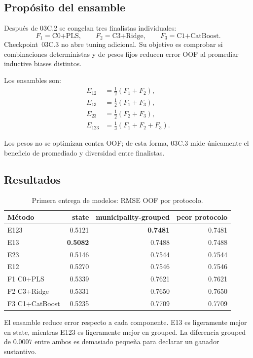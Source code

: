 \subsection{Propósito del ensamble}

Después de 03C.2 se congelan tres finalistas individuales:
\[
F_1=\text{C0+PLS},\qquad
F_2=\text{C3+Ridge},\qquad
F_3=\text{C1+CatBoost}.
\]
Checkpoint~03C.3 no abre tuning adicional. Su objetivo es comprobar si combinaciones
deterministas y de pesos fijos reducen error OOF al promediar inductive biases distintos.

Los ensambles son:
\begin{align}
E_{12}&=\frac{1}{2}(F_1+F_2),\\
E_{13}&=\frac{1}{2}(F_1+F_3),\\
E_{23}&=\frac{1}{2}(F_2+F_3),\\
E_{123}&=\frac{1}{3}(F_1+F_2+F_3).
\end{align}

Los pesos no se optimizan contra OOF; de esta forma, 03C.3 mide únicamente el beneficio de
promediado y diversidad entre finalistas.

\subsection{Resultados}

\begin{table}[H]
\centering
\caption{Primera entrega de modelos: RMSE OOF por protocolo.}
\label{tab:cp03c3-results}
\begin{tabular}{lrrr}
\toprule
Método & state & municipality-grouped & peor protocolo \\
\midrule
E123 & 0.5121 & \textbf{0.7481} & 0.7481 \\
E13 & \textbf{0.5082} & 0.7488 & 0.7488 \\
E23 & 0.5146 & 0.7544 & 0.7544 \\
E12 & 0.5270 & 0.7546 & 0.7546 \\
F1 C0+PLS & 0.5339 & 0.7621 & 0.7621 \\
F2 C3+Ridge & 0.5331 & 0.7650 & 0.7650 \\
F3 C1+CatBoost & 0.5235 & 0.7709 & 0.7709 \\
\bottomrule
\end{tabular}
\end{table}

El ensamble reduce error respecto a cada componente. E13 es ligeramente mejor en state,
mientras E123 es ligeramente mejor en grouped. La diferencia grouped de $0.0007$ entre ambos
es demasiado pequeña para declarar un ganador sustantivo.

